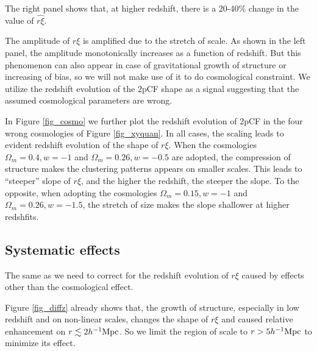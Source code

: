 \documentclass[iop]{emulateapj}
\begin{document}
The right panel shows that, 
at higher redshift, 
there is a 20-40\% change in the value of $\hat {r\xi}$.

The amplitude of $r\xi$ is amplified due to the stretch of scale.
As shown in the left panel, the amplitude monotonically increases as a function of redshift.
But this phenomenon can also appear in case of gravitational growth of structure or increasing of bias,
so we will not make use of it to do cosmological constraint.
We utilize the redshift evolution of the 2pCF shape as a signal suggesting that the assumed cosmological parameters are wrong.

In Figure \ref{fig_cosmo} we further plot the redshift evolution of 2pCF in the four wrong cosmologies of Figure \ref{fig_xyquan}.
In all cases, the scaling leads to evident redshift evolution of the shape of $r\xi$.
When the cosmologies $\Omega_m=0.4,w=-1$ and $\Omega_m=0.26,w=-0.5$ are adopted,
the compression of structure makes the clustering patterns appears on smaller scales.
This leads to ``steeper'' slope of $r\xi$, 
and the higher the redshift, the steeper the slope.
To the opposite, when adopting the cosmologies $\Omega_m=0.15,w=-1$ and $\Omega_m=0.26,w=-1.5$,
the stretch of size makes the slope shallower at higher redshfits.


\subsection{Systematic effects}

The same as \cite{Li2014,Li2015,Li2016} we need to correct for the redshift evolution of $r\xi$ caused by effects other than the cosmological effect.

Figure \ref{fig_diffz} already shows that, the growth of structure, especially in low redshift and on non-linear scales, 
changes the shape of $r\xi$ and caused relative enhancement on $r\lesssim2 h^{-1}\rm Mpc$.
So we limit the region of scale to $r>5h^{-1}\rm Mpc$ to minimize its effect.
\end{document}
